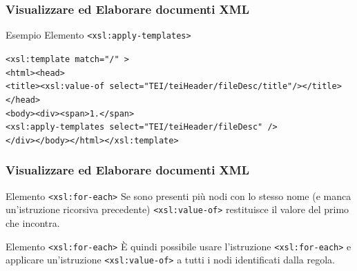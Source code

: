 \begin{frame}
    \frametitle{Visualizzare ed Elaborare documenti XML}
    \addtocounter{nframe}{1}
    

     \begin{block}{Esempio Elemento \texttt{<xsl:apply-templates>}}
        
        \texttt{<xsl:template match="/" >}
        \\\texttt{<html><head>}
        \\\texttt{<title><xsl:value-of select="TEI/teiHeader/fileDesc/title"/></title></head>}
        \\\texttt{<body><div><span>1.</span>}
        \\\texttt{<xsl:apply-templates select="TEI/teiHeader/fileDesc" />}
        \\\texttt{</div></body></html></xsl:template>}

     \end{block}
    
\end{frame}



\begin{frame}
    \frametitle{Visualizzare ed Elaborare documenti XML}
    \addtocounter{nframe}{1}
    

     \begin{block}{Elemento \texttt{<xsl:for-each>}}
        Se sono presenti più nodi con lo stesso nome (e manca un’istruzione ricorsiva precedente) \texttt{<xsl:value-of>} restituisce il valore del primo che incontra.
     \end{block}

     \begin{block}{Elemento \texttt{<xsl:for-each>}}
        È quindi possibile usare l’istruzione \texttt{<xsl:for-each>} e applicare un’istruzione \texttt{<xsl:value-of>} a tutti i nodi identificati dalla regola.
     \end{block}

\end{frame}

